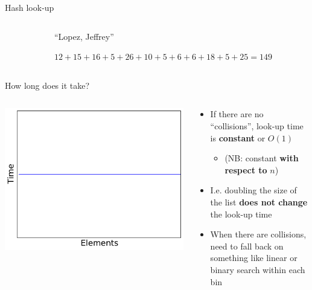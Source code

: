 \begin{frame}{Hash look-up}
	\begin{columns}
		\begin{column}{0.3\textwidth}
			{\tiny
			\begin{tabular}{|c|l|} \hline
				
			\end{tabular}
			}
		\end{column}
		\begin{column}{0.66\textwidth}
			``Lopez, Jeffrey'' \pause
			
			$12 + 15 + 16 + 5 + 26 + 10 + 5 + 6 + 6 + 18 + 5 + 25 = 149$
		\end{column}
	\end{columns}
\end{frame}

\begin{frame}{How long does it take?}
	\begin{columns}
		\begin{column}{0.45\textwidth}
			\includegraphics[width=\textwidth]{plot2_constant}
		\end{column}
		\begin{column}{0.55\textwidth}
			\begin{itemize}
				\item If there are no ``collisions'', look-up time is \textbf{constant} or $O(1)$ \pause
					\begin{itemize}
						\item (NB: constant \textbf{with respect to} $n$) \pause
					\end{itemize}
				\item I.e. doubling the size of the list \textbf{does not change} the look-up time \pause
				\item When there are collisions, need to fall back on something like linear or binary search within each bin
			\end{itemize}
		\end{column}
	\end{columns}
\end{frame}

